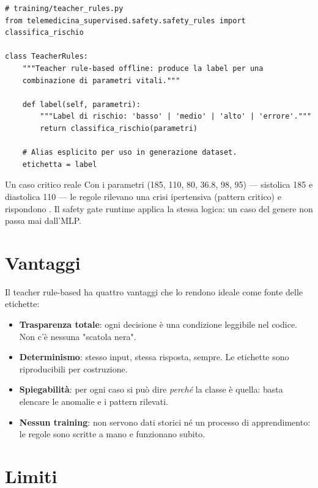 \begin{lstlisting}[caption={Il metodo label del teacher (codice reale, abbreviato)}]
# training/teacher_rules.py
from telemedicina_supervised.safety.safety_rules import classifica_rischio

class TeacherRules:
    """Teacher rule-based offline: produce la label per una
    combinazione di parametri vitali."""

    def label(self, parametri):
        """Label di rischio: 'basso' | 'medio' | 'alto' | 'errore'."""
        return classifica_rischio(parametri)

    # Alias esplicito per uso in generazione dataset.
    etichetta = label
\end{lstlisting}

\begin{esempio}{Un caso critico reale}
Con i parametri (185, 110, 80, 36.8, 98, 95) — sistolica 185 e diastolica
110 — le regole rilevano una crisi ipertensiva (pattern critico) e
rispondono . Il safety gate runtime applica la stessa logica:
un caso del genere non passa mai dall'MLP.
\end{esempio}

\section{Vantaggi}\label{sec:vantaggi}

Il teacher rule-based ha quattro vantaggi che lo rendono ideale come fonte
delle etichette:

\begin{itemize}
  \item \textbf{Trasparenza totale}: ogni decisione è una condizione
        leggibile nel codice. Non c'è nessuna "scatola nera".
  \item \textbf{Determinismo}: stesso input, stessa risposta, sempre. Le
        etichette sono riproducibili per costruzione.
  \item \textbf{Spiegabilità}: per ogni caso si può dire \emph{perché} la
        classe è quella: basta elencare le anomalie e i pattern rilevati.
  \item \textbf{Nessun training}: non servono dati storici né un processo di
        apprendimento: le regole sono scritte a mano e funzionano subito.
\end{itemize}

\section{Limiti}\label{sec:limiti}

